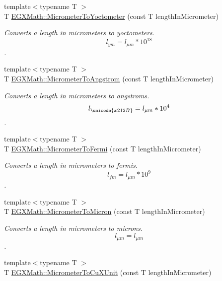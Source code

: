 \begin{DoxyCompactItemize}
{\footnotesize template$<$typename T $>$ }\\T \mbox{\hyperlink{group___e_g_x_math-_conversions-_length_conversions-_s_i-_micrometer-_s_i_ga58e346f8863d6679fecc09c55e253116}{E\+G\+X\+Math\+::\+Micrometer\+To\+Yoctometer}} (const T length\+In\+Micrometer)
\begin{DoxyCompactList}\small\item\em Converts a length in micrometers to yoctometers. \[ l_{ym}=l_{\mu m} * 10^{18} \]. \end{DoxyCompactList}\item 
{\footnotesize template$<$typename T $>$ }\\T \mbox{\hyperlink{group___e_g_x_math-_conversions-_length_conversions-_s_i-_micrometer-_non-_s_i_ga4b7df35169682046455e9a6f99447777}{E\+G\+X\+Math\+::\+Micrometer\+To\+Angstrom}} (const T length\+In\+Micrometer)
\begin{DoxyCompactList}\small\item\em Converts a length in micrometers to angstroms. \[ l_{\unicode{x212B}}=l_{\mu m} * 10^{4} \]. \end{DoxyCompactList}\item 
{\footnotesize template$<$typename T $>$ }\\T \mbox{\hyperlink{group___e_g_x_math-_conversions-_length_conversions-_s_i-_micrometer-_non-_s_i_ga23f5f429bc4df952e3d874fb944bd1ce}{E\+G\+X\+Math\+::\+Micrometer\+To\+Fermi}} (const T length\+In\+Micrometer)
\begin{DoxyCompactList}\small\item\em Converts a length in micrometers to fermis. \[ l_{fm}=l_{\mu m} * 10^{9} \]. \end{DoxyCompactList}\item 
{\footnotesize template$<$typename T $>$ }\\T \mbox{\hyperlink{group___e_g_x_math-_conversions-_length_conversions-_s_i-_micrometer-_non-_s_i_ga5dc2a5dba0313f6a71db082aff501329}{E\+G\+X\+Math\+::\+Micrometer\+To\+Micron}} (const T length\+In\+Micrometer)
\begin{DoxyCompactList}\small\item\em Converts a length in micrometers to microns. \[ l_{\mu m}=l_{\mu m} \]. \end{DoxyCompactList}\item 
{\footnotesize template$<$typename T $>$ }\\T \mbox{\hyperlink{group___e_g_x_math-_conversions-_length_conversions-_s_i-_micrometer-_non-_s_i_ga9ec609bbfdde5144c9f40d9093a5b8a7}{E\+G\+X\+Math\+::\+Micrometer\+To\+Cu\+X\+Unit}} (const T length\+In\+Micrometer)

\end{DoxyCompactItemize}
